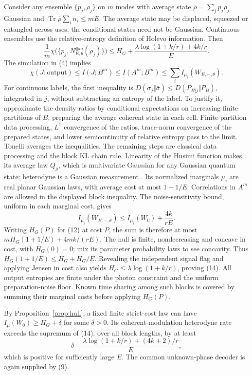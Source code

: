 \documentclass[11pt]{article}
\newcommand{\Tr}{\operatorname{Tr}}
\begin{document}
Consider any ensemble \(\{p_j,\rho_j\}\) on \(m\) modes with average
state \(\bar\rho=\sum_jp_j\rho_j\) Gaussian and
\(\Tr\bar\rho\sum_i n_i\leq mE\).
The average state may be displaced, squeezed or entangled across uses;
the conditional states need not be Gaussian. Continuous ensembles use
the relative-entropy definition of Holevo information. Then
\[
 \frac1m\chi\bigl(\{p_j,N_{E,\theta}^{\otimes m}(\rho_j)\}\bigr)
 \leq H_G+\frac{\lambda\log(1+k/r)+4k/r}{E}.                \tag{14}
\]
The simulation in (4) implies
\[
 \chi(J:\text{output})\leq I(J;B^m)
 \leq I(A^m;B^m)\leq\sum_i I_{\mu_i}(W_{E,-,\theta}).
\]
For continuous labels, the first inequality is
\(D(\sigma_j\Vert\bar\sigma)\leq D(P_{B|j}\Vert P_B)\), integrated
in \(j\), without subtracting an entropy of the label. To justify it,
approximate the density ratios by conditional expectations on increasing
finite partitions of \(B\), preparing the average coherent state in each
cell. Finite-partition data processing, \(L^1\) convergence of the
ratios, trace-norm convergence of the prepared states, and lower
semicontinuity of relative entropy pass to the limit. Tonelli averages
the inequalities. The remaining steps are classical data processing and
the block KL chain rule. Linearity of the Husimi function makes its average law
\(Q_{\bar\rho}\), which is multivariate Gaussian for any Gaussian
quantum state: heterodyne is a Gaussian measurement
\cite{gaussianReview}. Its normalized marginals \(\mu_i\) are real planar
Gaussian laws, with average cost at most \(1+1/E\).
Correlations in \(A^m\) are allowed in the displayed block inequality.
The noise-sensitivity bound, uniform in each marginal cost, gives
\[
 I_{\mu_i}(W_{E,-,\theta})\leq
 I_{\mu_i}(W_0)+\frac{4k}{rE}.
\]
Writing \(H_G(P)\) for (12) at cost \(P\), the sum is therefore
at most \(mH_G(1+1/E)+4mk/(rE)\).
The hull is finite, nondecreasing and concave in cost, with
\(H_G(0)=0\); mix its parameter probability laws to see concavity.
Thus \(H_G(1+1/E)\leq H_G+H_G/E\).
Revealing the independent signal flag and applying Jensen in cost
also yields \(H_G\leq\lambda\log(1+k/r)\), proving (14).
All output entropies are finite under the photon constraint and the
uniform preparation-noise floor. Known time sharing among such blocks
is covered by summing their marginal costs before applying \(H_G(P)\).

By Proposition~\ref{prop:hull}, a fixed finite strict-cost law
can have \(I_\mu(W_0)\geq H_G+\delta\) for some \(\delta>0\).
Its coherent-modulation heterodyne rate exceeds the supremum of (14),
over all block lengths, by at least
\[
 \delta-\frac{\lambda\log(1+k/r)+(4k+2)/r}{E},              \tag{15}
\]
which is positive for sufficiently large \(E\).
The common unknown-phase decoder is again supplied by (9).
\end{document}
